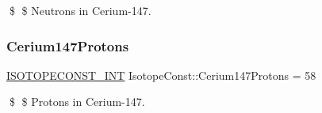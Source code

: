 \$ \$ Neutrons in Cerium-\/147. \mbox{\label{group___isotope_const-_cerium-_ce147_ga47f09f97e21ab0622132f0ddb76ca349}} 
\subsubsection{\texorpdfstring{Cerium147\+Protons}{Cerium147Protons}}
{\footnotesize\ttfamily \mbox{\hyperlink{group___isotope_const-_macros_ga5f18360b3e99483a35c32d789e62621c}{I\+S\+O\+T\+O\+P\+E\+C\+O\+N\+S\+T\+\_\+\+I\+NT}} Isotope\+Const\+::\+Cerium147\+Protons = 58}

\$ \$ Protons in Cerium-\/147. 